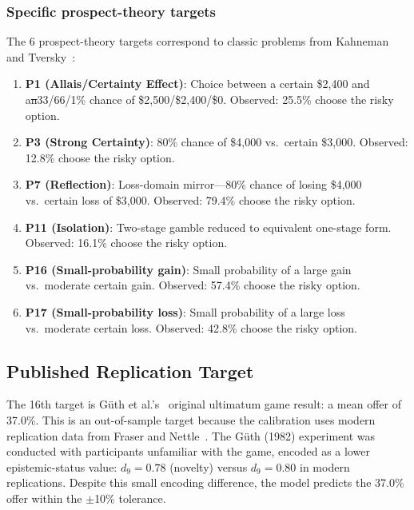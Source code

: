 \documentclass[journal]{IEEEtran}
\makeatletter
\providecommand{\DIFadd}[1]{{\protect\color{blue}\uwave{#1}}} %
\providecommand{\DIFdel}[1]{{\protect\color{red}\sout{#1}}} %
\providecommand{\DIFaddbegin}{} %
\providecommand{\DIFaddend}{} %
\providecommand{\DIFdelbegin}{} %
\providecommand{\DIFdelend}{} %
\providecommand{\DIFscaledelfig}{0.5}
\newlength{\DIFdelgraphicswidth} %
\newlength{\DIFdelgraphicsheight} %
\providecommand{\DIFaddincludegraphics}[2][]{{\color{blue}\fbox{\DIFOincludegraphics[#1]{#2}}}} %
\providecommand{\DIFdelincludegraphics}[2][]{%
\sbox{\DIFdelgraphicsbox}{\DIFOincludegraphics[#1]{#2}}%
\settoboxwidth{\DIFdelgraphicswidth}{\DIFdelgraphicsbox} %
\settoboxtotalheight{\DIFdelgraphicsheight}{\DIFdelgraphicsbox} %
\scalebox{\DIFscaledelfig}{%
\parbox[b]{\DIFdelgraphicswidth}{\usebox{\DIFdelgraphicsbox}\\[-\baselineskip] \rule{\DIFdelgraphicswidth}{0em}}\llap{\resizebox{\DIFdelgraphicswidth}{\DIFdelgraphicsheight}{%
\setlength{\unitlength}{\DIFdelgraphicswidth}%
\begin{picture}(1,1)%
\thicklines\linethickness{2pt} %
{\color[rgb]{1,0,0}\put(0,0){\framebox(1,1){}}}%
{\color[rgb]{1,0,0}\put(0,0){\line( 1,1){1}}}%
{\color[rgb]{1,0,0}\put(0,1){\line(1,-1){1}}}%
\end{picture}%
}\hspace*{3pt}}} %
} %
\DeclareRobustCommand{\DIFaddbegin}{\DIFOaddbegin \let\includegraphics\DIFaddincludegraphics} %
\DeclareRobustCommand{\DIFaddend}{\DIFOaddend \let\includegraphics\DIFOincludegraphics} %
\DeclareRobustCommand{\DIFdelbegin}{\DIFOdelbegin \let\includegraphics\DIFdelincludegraphics} %
\DeclareRobustCommand{\DIFdelend}{\DIFOaddend \let\includegraphics\DIFOincludegraphics} %
\let\sout@orig\sout %
\renewcommand{\sout}[1]{\ifmmode\text{\sout@orig{\ensuremath{#1}}}\else\sout@orig{#1}\fi} %
\makeatother
\begin{document}
\subsubsection{Specific prospect-theory targets}
The 6 prospect-theory targets correspond to classic problems from Kahneman and Tversky~\cite{kahneman1979}:
\begin{enumerate}
    \item \textbf{P1 (Allais/Certainty Effect)}\DIFaddbegin \DIFadd{~\mbox{%
\cite{allais1953}}\hskip0pt%
}\DIFaddend : Choice between a certain \$2,400 and a\DIFdelbegin \DIFdel{n}\DIFdelend  33/66/1\% chance of \$2,500/\$2,400/\$0. Observed: 25.5\% choose the risky option.
    \item \textbf{P3 (Strong Certainty)}: 80\% chance of \$4,000 vs.\ certain \$3,000. Observed: 12.8\% choose the risky option.
    \item \textbf{P7 (Reflection)}: Loss-domain mirror---80\% chance of losing \$4,000 vs.\ certain loss of \$3,000. Observed: 79.4\% choose the risky option.
    \item \textbf{P11 (Isolation)}: Two-stage gamble reduced to equivalent one-stage form. Observed: 16.1\% choose the risky option.
    \item \textbf{P16 (Small-probability gain)}: Small probability of a large gain vs.\ moderate certain gain. Observed: 57.4\% choose the risky option.
    \item \textbf{P17 (Small-probability loss)}: Small probability of a large loss vs.\ moderate certain loss. Observed: 42.8\% choose the risky option.
\end{enumerate}

\subsection{Published Replication Target}

The 16th target is G\"uth et al.'s~\cite{guth1982} original ultimatum game result: a mean offer of 37.0\%.
This is an out-of-sample target because the calibration uses modern replication data from Fraser and Nettle~\cite{fraser2020}.
The G\"uth (1982) experiment was conducted with participants unfamiliar with the game, encoded as a lower epistemic-status value: $d_9 = 0.78$ (novelty) versus $d_9 = 0.80$ in modern replications.
Despite this small encoding difference, the model predicts the 37.0\% offer within the $\pm$10\% tolerance.


\end{document}
